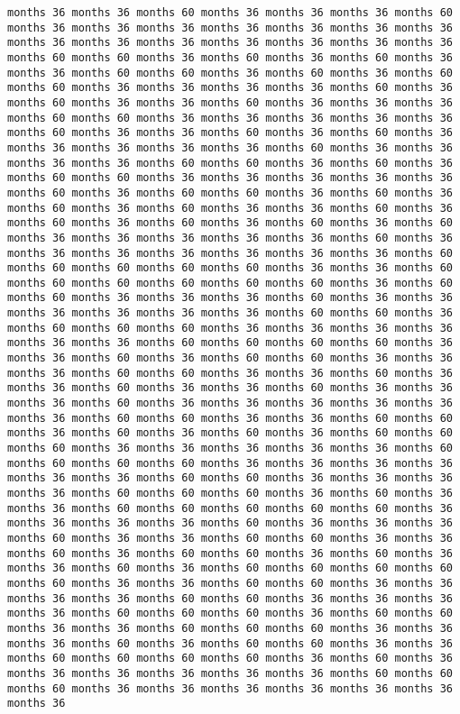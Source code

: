 \documentclass[11pt]{article}
\begin{document}
\begin{Verbatim}[commandchars=\\\{\}, frame=single, framerule=2mm, rulecolor=\color{outerrorbackground}]
months 36 months 36 months 60 months 36 months 36 months 36 months 60 months 36 months 36 months 36 months 36 months 36 months 36 months 36 months 36 months 36 months 36 months 36 months 36 months 36 months 36 months 60 months 60 months 36 months 60 months 36 months 60 months 36 months 36 months 60 months 60 months 36 months 60 months 36 months 60 months 60 months 36 months 36 months 36 months 36 months 60 months 36 months 60 months 36 months 36 months 60 months 36 months 36 months 36 months 60 months 60 months 36 months 36 months 36 months 36 months 36 months 60 months 36 months 36 months 60 months 36 months 60 months 36 months 36 months 36 months 36 months 36 months 60 months 36 months 36 months 36 months 36 months 60 months 60 months 36 months 60 months 36 months 60 months 60 months 36 months 36 months 36 months 36 months 36 months 60 months 36 months 60 months 60 months 36 months 60 months 36 months 60 months 36 months 60 months 36 months 36 months 60 months 36 months 60 months 36 months 60 months 36 months 60 months 36 months 60 months 36 months 36 months 36 months 36 months 36 months 60 months 36 months 36 months 36 months 36 months 36 months 36 months 36 months 60 months 60 months 60 months 60 months 60 months 36 months 36 months 60 months 60 months 60 months 60 months 60 months 60 months 36 months 60 months 60 months 36 months 36 months 36 months 60 months 36 months 36 months 36 months 36 months 36 months 36 months 60 months 60 months 36 months 60 months 60 months 60 months 36 months 36 months 36 months 36 months 36 months 36 months 60 months 60 months 60 months 60 months 36 months 36 months 60 months 36 months 60 months 60 months 36 months 36 months 36 months 60 months 60 months 36 months 36 months 60 months 36 months 36 months 60 months 36 months 36 months 60 months 36 months 36 months 36 months 60 months 36 months 36 months 36 months 36 months 36 months 36 months 60 months 60 months 36 months 36 months 60 months 60 months 36 months 60 months 36 months 60 months 36 months 60 months 60 months 60 months 36 months 36 months 36 months 36 months 36 months 60 months 60 months 60 months 60 months 36 months 36 months 36 months 36 months 36 months 36 months 60 months 60 months 36 months 36 months 36 months 36 months 60 months 60 months 60 months 36 months 60 months 36 months 36 months 60 months 60 months 60 months 60 months 60 months 36 months 36 months 36 months 36 months 60 months 36 months 36 months 36 months 60 months 36 months 36 months 60 months 60 months 36 months 36 months 60 months 36 months 60 months 60 months 36 months 60 months 36 months 36 months 60 months 36 months 60 months 60 months 60 months 60 months 60 months 36 months 36 months 60 months 60 months 36 months 36 months 36 months 36 months 60 months 60 months 36 months 36 months 36 months 36 months 60 months 60 months 60 months 36 months 60 months 60 months 36 months 36 months 60 months 60 months 60 months 36 months 36 months 36 months 60 months 36 months 60 months 60 months 36 months 36 months 60 months 60 months 60 months 60 months 36 months 60 months 36 months 36 months 36 months 36 months 36 months 36 months 60 months 60 months 60 months 36 months 36 months 36 months 36 months 36 months 36 months 36 
\end{Verbatim}
\end{document}

